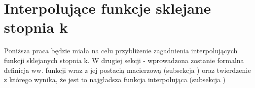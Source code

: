 \section{Interpolujące funkcje sklejane stopnia k} 
\label{sekcja1:wstęp}
Poniższa praca będzie miała na celu przybliżenie zagadnienia interpolujących funkcji 
sklejanych stopnia k. W drugiej sekcji - 
wprowadzona zostanie formalna definicja ww. funkcji wraz z jej postacią macierzową 
(subsekcja ) oraz twierdzenie z którego wynika, że
jest to najgładsza funkcja interpolująca (subsekcja )
